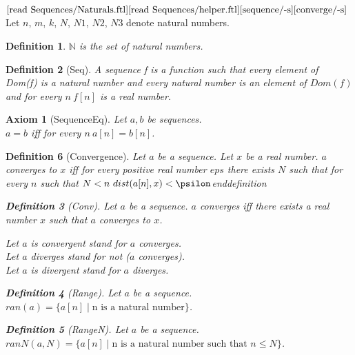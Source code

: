 \documentclass{article}
\newenvironment{forthel}{\begin{leftbar}}{\end{leftbar}}
\newtheorem{axiom}{Axiom}
\newtheorem{definition}{Definition}
\newcommand{\NN}{\mathbb{N}}
\begin{document}
\begin{forthel}
	\noindent $\text{[read Sequences/Naturals.ftl]}\\
	\text{[read Sequences/helper.ftl]}\\
	\text{[sequence/-s]}\\
	\text{[converge/-s]}$\\
	Let $n$, $m$, $k$, $N$, $N1$, $N2$, $N3$ denote natural numbers.

	\begin{definition}
		$\NN$ is the set of natural numbers.
	\end{definition}
	
	\begin{definition}[Seq]	A sequence f is a function such that every element of Dom(f) is a natural number and every
	natural number is an element of $Dom(f)$ and for every $n \ f[n]$ is a real number.
	\end{definition}
	
	\begin{axiom}[SequenceEq] Let $a, b$ be sequences. \\ $a = b$ iff for every $n \ a[n] = b[n]$.
	\end{axiom}
	
	\begin{definition}[Convergence] Let $a$ be a sequence. Let $x$ be a real number. $a$ converges to $x$ iff for every positive real
	number $eps$ there exists $N$ such that for every $n$ such that $N < n \ dist(a[n],x) < \psilon$end{definition}
	
	\begin{definition}[Conv] Let $a$ be a sequence. $a$ converges iff there exists a real number $x$ such that $a$ converges to $x$.
	\end{definition}
	
	\noindent Let $a$ is convergent stand for $a$ converges.
	\\Let $a$ diverges stand for not ($a$ converges).
	\\Let $a$ is divergent stand for $a$ diverges.
	
	\begin{definition}[Range] Let $a$ be a sequence. \\ $ran(a) = \{a[n] \mid \text{n is a natural number} \}$. 
	\end{definition}

	\begin{definition}[RangeN] Let $a$ be a sequence. \\ $ranN(a,N) = \{a[n] \mid \text{n is a natural number such that } n \leq N\}$. 
	\end{definition}
	

\end{definition}
\end{forthel}
\end{document}
